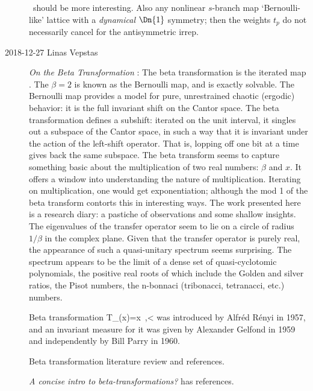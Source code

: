 \begin{description}
\tempLatt\ should be more interesting. Also any nonlinear $s$-branch map
`Bernoulli-like' lattice with a \emph{dynamical} $\Dn{1}$ symmetry; then
the weights $t_p$ do not necessarily cancel for the antisymmetric irrep.

\item[2018-12-27 Linas Vepstas]
{\em On the Beta Transformation} :
The beta transformation is the iterated map . The
$\beta=2$ is known as the Bernoulli map, and is exactly solvable. The Bernoulli
map provides a model for pure, unrestrained chaotic (ergodic) behavior:
it is the full invariant shift on the Cantor space. The beta
transformation defines a subshift: iterated on the unit interval, it
singles out a subspace of the Cantor space, in such a way that it is
invariant under the action of the left-shift operator. That is, lopping
off one bit at a time gives back the same subspace. The beta transform
seems to capture something basic about the multiplication of two real
numbers: $\beta$ and $x$. It offers a window into understanding the nature of
multiplication. Iterating on multiplication, one would get
exponentiation; although the mod 1 of the beta transform contorts this in
interesting ways. The work presented here is a research diary: a pastiche
of observations and some shallow insights.
 The eigenvalues of the
transfer operator seem to lie on a circle of radius $1/\beta$ in the complex
plane. Given that the transfer operator is purely real, the appearance of
such a quasi-unitary spectrum seems surprising. The spectrum appears to
be the limit of a dense set of quasi-cyclotomic polynomials, the positive
real roots of which include the Golden and silver ratios, the Pisot
numbers, the n-bonnaci (tribonacci, tetranacci, etc.) numbers.

Beta transformation
\beq
T_{\beta }(x)=\beta x
\,,<\beta{}
was introduced by Alfr{\'e}d R{\'e}nyi in 1957, and an invariant measure for
it was given by Alexander Gelfond in 1959 and independently by Bill
Parry in 1960.

{Beta transformation literature review and references}.

{{\em A concise intro to beta-transformations?}} has references.



\end{description}
